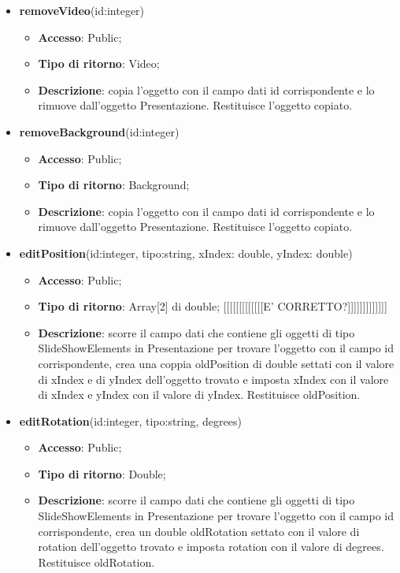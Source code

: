{{\begin{itemize}
\begin{itemize}
			\end{itemize}
			\item \textbf{removeVideo}(id:integer)
			\begin{itemize}
				\item \textbf{Accesso}: Public;
				\item \textbf{Tipo di ritorno}: Video;
				\item \textbf{Descrizione}: copia l’oggetto con il campo dati id corrispondente e lo rimuove dall’oggetto Presentazione. Restituisce l’oggetto copiato.
			\end{itemize}
			\item \textbf{removeBackground}(id:integer)
			\begin{itemize}
				\item \textbf{Accesso}: Public;
				\item \textbf{Tipo di ritorno}: Background;
				\item \textbf{Descrizione}: copia l’oggetto con il campo dati id corrispondente e lo rimuove dall’oggetto Presentazione. Restituisce l’oggetto copiato.
			\end{itemize}
			\item \textbf{editPosition}(id:integer, tipo:string,  xIndex: double, yIndex: double)
			\begin{itemize}
				\item \textbf{Accesso}: Public;
				\item \textbf{Tipo di ritorno}: Array[2] di double; [[[[[[[[[[[[[E' CORRETTO?]]]]]]]]]]]]]
				\item \textbf{Descrizione}: scorre il campo dati che contiene gli oggetti di tipo SlideShowElements in Presentazione per trovare l’oggetto con il campo id corrispondente, crea una coppia oldPosition di double settati con il valore di xIndex e di yIndex dell’oggetto trovato e imposta xIndex con il valore di xIndex e yIndex con il valore di yIndex. Restituisce oldPosition.
			\end{itemize}
			\item \textbf{editRotation}(id:integer, tipo:string,  degrees)
			\begin{itemize}
				\item \textbf{Accesso}: Public;
				\item \textbf{Tipo di ritorno}: Double;
				\item \textbf{Descrizione}: scorre il campo dati che contiene gli oggetti di tipo SlideShowElements in Presentazione per trovare l’oggetto con il campo id corrispondente, crea un double oldRotation settato con il valore di rotation dell’oggetto trovato e imposta rotation con il valore di degrees. Restituisce oldRotation.

\end{itemize}
\end{itemize}}}
